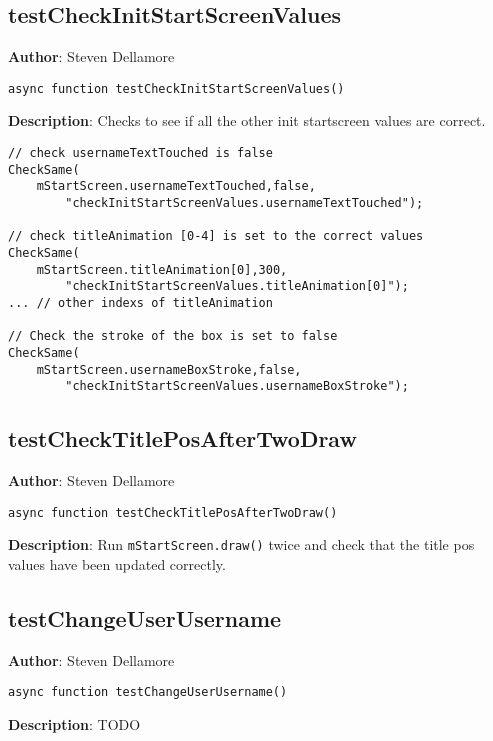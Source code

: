 \documentclass[12pt]{article}
\begin{document}
\subsection{testCheckInitStartScreenValues}
\textbf{Author}: Steven Dellamore 
\vspace*{1\baselineskip}
\begin{lstlisting}
async function testCheckInitStartScreenValues()
\end{lstlisting} 
\vspace*{1\baselineskip}
\textbf{Description}: Checks to see if all the other init startscreen values are correct. 
\begin{verbatim}
// check usernameTextTouched is false
CheckSame(
    mStartScreen.usernameTextTouched,false,
        "checkInitStartScreenValues.usernameTextTouched");

// check titleAnimation [0-4] is set to the correct values
CheckSame(
    mStartScreen.titleAnimation[0],300,
        "checkInitStartScreenValues.titleAnimation[0]");
... // other indexs of titleAnimation

// Check the stroke of the box is set to false
CheckSame(
    mStartScreen.usernameBoxStroke,false,
        "checkInitStartScreenValues.usernameBoxStroke");
\end{verbatim}
 



\subsection{testCheckTitlePosAfterTwoDraw}
\textbf{Author}: Steven Dellamore 
\vspace*{1\baselineskip}
\begin{lstlisting}
async function testCheckTitlePosAfterTwoDraw()
\end{lstlisting} 
\vspace*{1\baselineskip}
\textbf{Description}: Run \texttt{mStartScreen.draw()} twice and check that the title pos values have been updated correctly. 



\subsection{testChangeUserUsername}
\textbf{Author}: Steven Dellamore 
\vspace*{1\baselineskip}
\begin{lstlisting}
async function testChangeUserUsername()
\end{lstlisting} 
\vspace*{1\baselineskip}
\textbf{Description}: TODO 
\end{document}
